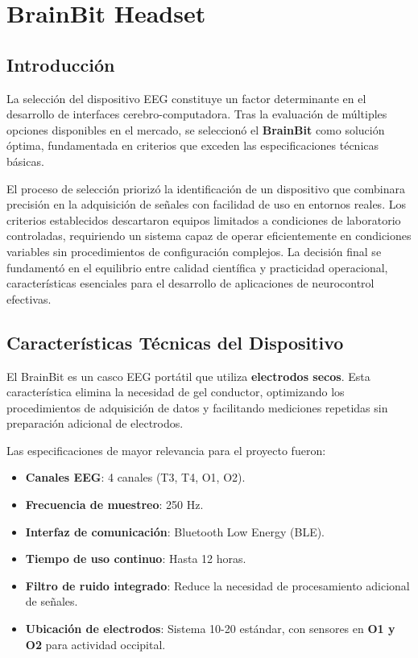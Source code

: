 \chapter{BrainBit Headset}

\section{Introducci\'on}
La selección del dispositivo EEG constituye un factor determinante en el desarrollo de interfaces cerebro-computadora. Tras la evaluación de múltiples opciones disponibles en el mercado, se seleccionó el \textbf{BrainBit} \cite{brainbit} como solución óptima, fundamentada en criterios que exceden las especificaciones técnicas básicas.

El proceso de selección priorizó la identificación de un dispositivo que combinara precisión en la adquisición de señales con facilidad de uso en entornos reales. Los criterios establecidos descartaron equipos limitados a condiciones de laboratorio controladas, requiriendo un sistema capaz de operar eficientemente en condiciones variables sin procedimientos de configuración complejos. La decisión final se fundamentó en el equilibrio entre calidad científica y practicidad operacional, características esenciales para el desarrollo de aplicaciones de neurocontrol efectivas.

\section{Características Técnicas del Dispositivo}
El BrainBit es un casco EEG portátil que utiliza \textbf{electrodos secos}. Esta característica elimina la necesidad de gel conductor, optimizando los procedimientos de adquisición de datos y facilitando mediciones repetidas sin preparación adicional de electrodos.

Las especificaciones de mayor relevancia para el proyecto fueron:

    \begin{itemize}
        \item \textbf{Canales EEG}: 4 canales (T3, T4, O1, O2).
        \item \textbf{Frecuencia de muestreo}: 250 Hz.
        \item \textbf{Interfaz de comunicación}: Bluetooth Low Energy (BLE).
        \item \textbf{Tiempo de uso continuo}: Hasta 12 horas.
        \item \textbf{Filtro de ruido integrado}: Reduce la necesidad de procesamiento adicional de señales.
        \item \textbf{Ubicación de electrodos}: Sistema 10-20 estándar, con sensores en \textbf{O1 y O2} para actividad occipital.
    \end{itemize}

